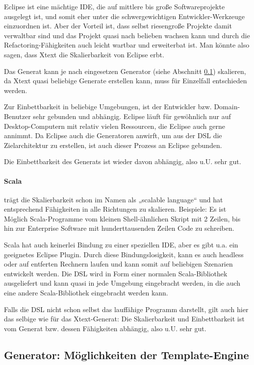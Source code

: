Eclipse ist eine mächtige IDE, die auf mittlere bis große Softwareprojekte
ausgelegt ist, und somit eher unter die schwergewichtigen Entwickler-Werkzeuge
einzuordnen ist. Aber der Vorteil ist, dass selbst riesengroße Projekte
damit verwaltbar sind und das Projekt quasi nach belieben wachsen kann und
durch die Refactoring-Fähigkeiten auch leicht wartbar und erweiterbat ist.
Man könnte also sagen, dass Xtext die Skalierbarkeit von Eclipse erbt.

Das Generat kann je nach eingesetzen Generator (siehe Abschnitt
\ref{sec-generator}) skalieren, da Xtext quasi beliebige Generate erstellen
kann, muss für Einzelfall entschieden werden.

Zur Einbettbarkeit in beliebige Umgebungen, ist der Entwickler bzw.
Domain-Benutzer sehr gebunden und abhängig. Eclipse läuft für gewöhnlich
nur auf Desktop-Computern mit relativ vielen Ressourcen, die Eclipse auch
gerne annimmt. Da Eclipse auch die Generatoren anwirft, um aus der DSL
die Zielarchitektur zu erstellen, ist auch dieser Prozess an Eclipse gebunden.

Die Einbettbarkeit des Generats ist wieder davon abhängig, also u.U.
sehr gut.

\paragraph{Scala} trägt die Skalierbarkeit schon im Namen als
„scalable language“ und hat entsprechend Fähigkeiten in alle Richtungen
zu skalieren. Beispiele: Es ist Möglich Scala-Programme vom kleinen
Shell-ähnlichen Skript mit 2 Zeilen, bis hin zur Enterprise Software
mit hunderttausenden Zeilen Code zu schreiben.

Scala hat auch keinerlei Bindung zu einer speziellen IDE, aber es gibt
u.a. ein geeignetes Eclipse Plugin. Durch diese Bindungslosigkeit, kann
es auch headless oder auf entferten Rechnern laufen und kann somit auf
beliebigen Szenarien entwickelt werden.
Die DSL wird in Form einer normalen Scala-Bibliothek ausgeliefert und
kann quasi in jede Umgebung eingebracht werden, in die auch eine andere
Scala-Bibliothek eingebracht werden kann.

Falls die DSL nicht schon selbst das lauffähige Programm darstellt, gilt
auch hier das selbige wie für das Xtext-Generat: Die Skalierbarkeit und
Einbettbarkeit ist vom Generat bzw. dessen Fähigkeiten abhängig, also u.U.
sehr gut.


\subsection{Generator: Möglichkeiten der Template-Engine}\label{sec-generator}

